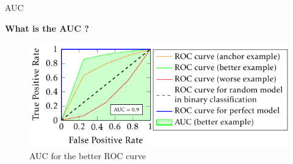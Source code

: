 \begin{frame}{AUC}
    
    {\large\textbf{What is the AUC ?}}

    \begin{figure}
        \centering
        \includegraphics[page=1]{images/output-figure4.pdf}
        \caption{AUC for the better ROC curve}
    \end{figure}

                

\end{frame}
